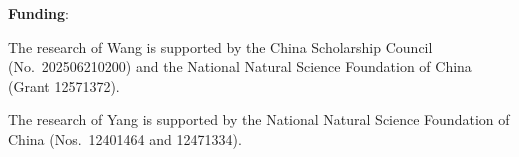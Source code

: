\documentclass[11pt]{article}
\numberwithin{equation}{section}
\begin{document}



\bigskip

\textbf{Funding}:

The research of Wang is supported by the China Scholarship Council (No.~202506210200) and the National Natural Science Foundation of China (Grant 12571372).

The research of Yang is supported by the National Natural Science Foundation of China (Nos.~12401464 and 12471334).
\end{document}
